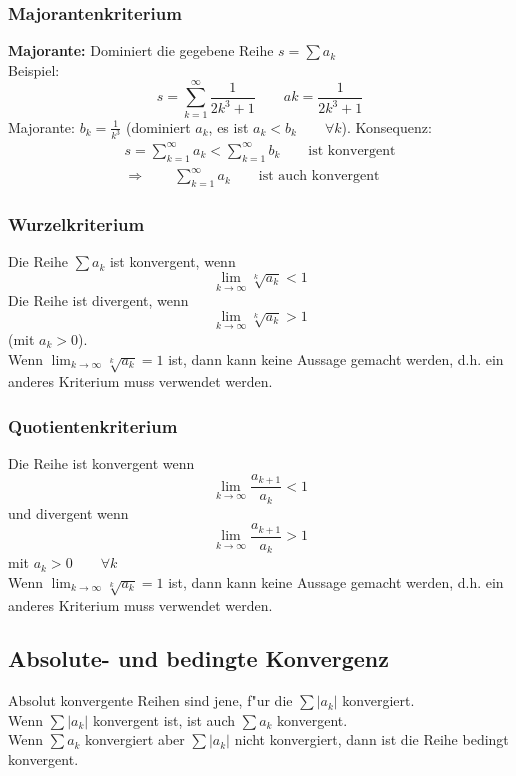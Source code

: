 \subsubsection{Majorantenkriterium}
\textbf{Majorante:} Dominiert die gegebene Reihe $s=\sum a_k$ \\
Beispiel:
\begin{equation}
  s = \sum_{k=1}^\infty\frac{1}{2k^3+1}\qquad ak=\frac{1}{2k^3+1}
\end{equation}
Majorante: $b_k=\frac{1}{k^3}$ (dominiert $a_k$, es ist $a_k < b_k \qquad\forall k$).
Konsequenz:
\begin{gather}
  s = \sum_{k=1}^\infty a_k < \sum_{k=1}^\infty b_k \qquad\text{ist konvergent} \\
  \Longrightarrow\qquad\sum_{k=1}^\infty a_k \qquad\text{ist auch konvergent}
\end{gather}


\subsubsection{Wurzelkriterium}
Die Reihe $\sum a_k$ ist konvergent, wenn
\begin{equation}
  \lim_{k\rightarrow\infty}\sqrt[k]{a_k} < 1
\end{equation}
Die Reihe ist divergent, wenn
\begin{equation}
  \lim_{k\rightarrow\infty}\sqrt[k]{a_k} > 1
\end{equation}
(mit $a_k > 0$).\\
Wenn $\lim_{k\to\infty}\sqrt[k]{a_k} = 1$ ist, dann kann keine Aussage gemacht werden,
d.h. ein anderes Kriterium muss verwendet werden.


\subsubsection{Quotientenkriterium}
Die Reihe ist konvergent wenn
\begin{equation}
  \lim_{k\rightarrow\infty}\frac{a_{k+1}}{a_k} < 1
\end{equation}
und divergent wenn
\begin{equation}
  \lim_{k\rightarrow\infty}\frac{a_{k+1}}{a_k} > 1
\end{equation}
mit $a_k > 0 \qquad\forall k$\\
Wenn $\lim_{k\to\infty}\sqrt[k]{a_k}=1$ ist, dann kann keine Aussage gemacht werden,
d.h. ein anderes Kriterium muss verwendet werden.


\subsection{Absolute- und bedingte Konvergenz}
Absolut konvergente Reihen sind jene, f"ur die $\sum |a_k|$ konvergiert. \\
Wenn $\sum |a_k|$ konvergent ist, ist auch $\sum a_k$ konvergent. \\
Wenn $\sum a_k$ konvergiert aber $\sum |a_k|$ nicht konvergiert,
dann ist die Reihe bedingt konvergent.


